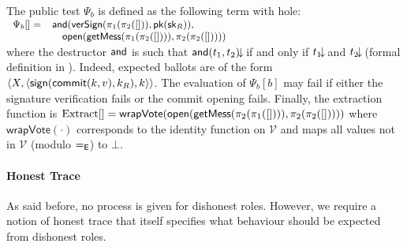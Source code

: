 \begin{example}
\label{ex:foo-tally}
The public test $\Psi_b$ is defined as the following term with hole:\\[0.5mm]
\null\hfill
$
\begin{small}
  \begin{array}{rl}
    \Psi_b[]=&\AND(\versign(\projl(\projr([])),\pk(\sk_R)), \\
             &\ \ \ \open(\getMess(\projl(\projr([]))), \projr(\projr([]))))\\
  \end{array}
\end{small}
$\hfill\null\\[0.5mm]
where the destructor $\mathsf{and}$ is such that $\mathsf{and}(t_1,t_2){\!\downarrow\!}$ if and only if
$t_1{\!\downarrow\!}$ and $t_2{\!\downarrow\!}$ (formal definition in ).
Indeed, expected ballots are of the form
$\langle X,\langle \mathsf{sign}(\mathsf{commit}(k,v),k_R),k \rangle \rangle$.
The evaluation of $\Psi_b[b]$ may fail %
if
either the signature verification fails or the commit opening fails.
Finally, the extraction function is
$\mathrm{Extract}[]=
\mathsf{wrapVote}(\mathsf{open}(\mathsf{getMess}(\pi_2(\pi_1([]))),\pi_2(\pi_2([]))))$
where $\mathsf{wrapVote}(\cdot)$ corresponds to the identity function on
$\mathcal{V}$ and maps all values not in $\mathcal{V}$ (modulo $=_{\mathsf{E}}$) to $\bot$.
\end{example}


\paragraph{\textbf{Honest Trace}}
As said before, no process is given for dishonest roles.
However, we require a notion of honest trace that itself
specifies what behaviour should be expected from dishonest roles.

